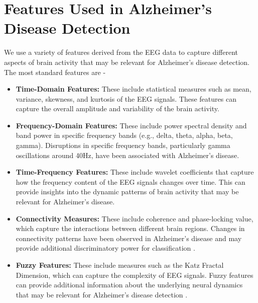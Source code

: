\documentclass[openany]{book}
\begin{document}
\section{Features Used in Alzheimer's Disease Detection}
\label{sec:feat_hz}
We use a variety of features derived from the EEG data to capture different aspects of brain activity that may be relevant for Alzheimer's disease detection. The most standard features are - 
\begin{itemize}
    \item \textbf{Time-Domain Features:} These include statistical measures such as mean, variance, skewness, and kurtosis of the EEG signals. These features can capture the overall amplitude and variability of the brain activity.
    \item \textbf{Frequency-Domain Features:} These include power spectral density and band power in specific frequency bands (e.g., delta, theta, alpha, beta, gamma). Disruptions in specific frequency bands, particularly gamma oscillations around 40Hz, have been associated with Alzheimer's disease.
    \item \textbf{Time-Frequency Features:} These include wavelet coefficients that capture how the frequency content of the EEG signals changes over time. This can provide insights into the dynamic patterns of brain activity that may be relevant for Alzheimer's disease.
      \item \textbf{Connectivity Measures:} These include coherence and phase-locking value, which capture the interactions between different brain regions. Changes in connectivity patterns have been observed in Alzheimer's disease and may provide additional discriminatory power for classification \cite{stam2007graph, engels2015gamma}.
      \item \textbf{Fuzzy Features:} These include measures such as the Katz Fractal Dimension, which can capture the complexity of EEG signals. Fuzzy features can provide additional information about the underlying neural dynamics that may be relevant for Alzheimer's disease detection \cite{jang1993anfis}.
\end{itemize}
\end{document}
